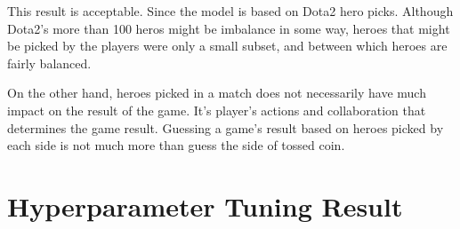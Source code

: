 \documentclass[12pt]{article}
\begin{document}
This result is acceptable. Since the model is based on Dota2 hero picks. Although Dota2's more than 100 heros might be imbalance in some way, heroes that might be picked by the players were only a small subset, and between which heroes are fairly balanced.

On the other hand, heroes picked in a match does not necessarily have much impact on the result of the game. It's player's actions and collaboration that determines the game result. Guessing a game's result based on heroes picked by each side is not much more than guess the side of tossed coin.

\appendix

\section{Hyperparameter Tuning Result}\label{ahtr}


\end{document}
